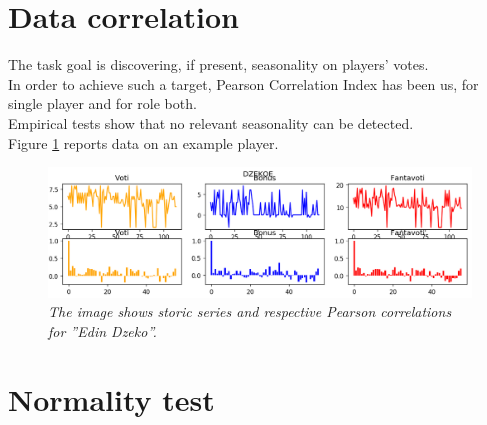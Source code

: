 \newpage
\section{Data correlation}

The task goal is discovering, if present, seasonality on players' votes.
\\
In order to achieve such a target, Pearson Correlation Index has been us, for single player and for role both.
\\
Empirical tests show that no relevant seasonality can be detected.
\\
Figure \ref{fig:playereg} reports data on an example player.

\begin{figure}[H]
  \includegraphics[scale=0.5]{images/img-03.png}
   \caption{\textit{The image shows storic series and respective Pearson correlations for ''Edin Dzeko''.}}
  \label{fig:playereg}
\end{figure}

\section{Normality test}


  